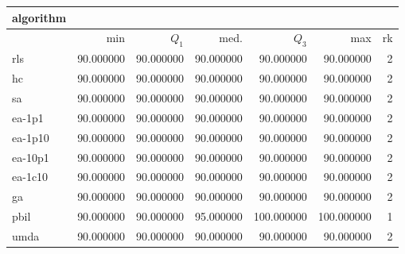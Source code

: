 \begin{tabular}{@{}l*{5}{>{{}}N{3}{0}}>{{}}N{2}{0}@{}}
\toprule
{algorithm} &  \\
\midrule
& {min} & {$Q_1$} & {med.} & {$Q_3$} & {max} & {rk}\\
\midrule
rls & {\color{blue}} 90.000000 & {\color{blue}} 90.000000 & 90.000000 & 90.000000 & 90.000000 & 2\\
hc & {\color{blue}} 90.000000 & {\color{blue}} 90.000000 & 90.000000 & 90.000000 & 90.000000 & 2\\
sa & {\color{blue}} 90.000000 & {\color{blue}} 90.000000 & 90.000000 & 90.000000 & 90.000000 & 2\\
ea-1p1 & {\color{blue}} 90.000000 & {\color{blue}} 90.000000 & 90.000000 & 90.000000 & 90.000000 & 2\\
ea-1p10 & {\color{blue}} 90.000000 & {\color{blue}} 90.000000 & 90.000000 & 90.000000 & 90.000000 & 2\\
ea-10p1 & {\color{blue}} 90.000000 & {\color{blue}} 90.000000 & 90.000000 & 90.000000 & 90.000000 & 2\\
ea-1c10 & {\color{blue}} 90.000000 & {\color{blue}} 90.000000 & 90.000000 & 90.000000 & 90.000000 & 2\\
ga & {\color{blue}} 90.000000 & {\color{blue}} 90.000000 & 90.000000 & 90.000000 & 90.000000 & 2\\
pbil & {\color{blue}} 90.000000 & {\color{blue}} 90.000000 & {\color{blue}} 95.000000 & {\color{blue}} 100.000000 & {\color{blue}} 100.000000 & 1\\
umda & {\color{blue}} 90.000000 & {\color{blue}} 90.000000 & 90.000000 & 90.000000 & 90.000000 & 2\\
\bottomrule
\end{tabular}
